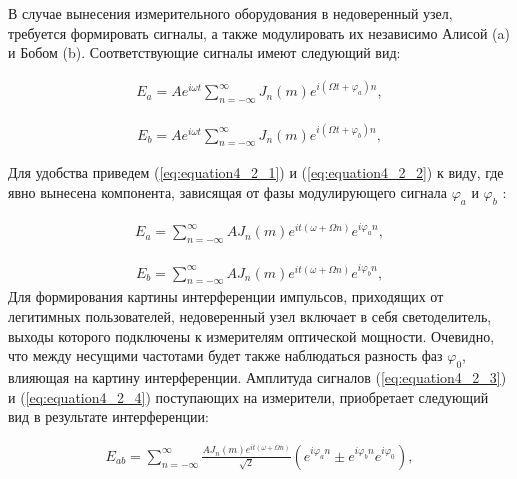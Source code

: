 В случае вынесения измерительного оборудования в недоверенный узел, требуется формировать сигналы, а также модулировать их независимо Алисой (a) и Бобом (b). Соответствующие сигналы имеют следующий вид:

\begin{equation}
	\begin{aligned}
	\label{eq:equation4_2_1}
		E_a = Ae^{i \omega t} \sum_{n=-\infty}^\infty J_{n}(m) e^{i (\Omega t+ \varphi_a) n},
	\end{aligned}
\end{equation}

\begin{equation}
	\begin{aligned}
	\label{eq:equation4_2_2}
		E_b = Ae^{i \omega t} \sum_{n=-\infty}^\infty J_{n}(m) e^{i (\Omega t+ \varphi_b) n},
	\end{aligned}
\end{equation}

Для удобства приведем (\ref{eq:equation4_2_1}) и (\ref{eq:equation4_2_2}) к виду, где явно вынесена компонента, зависящая от фазы модулирующего сигнала $\varphi_a$ и $\varphi_b$ :

\begin{equation}
	\begin{aligned}
	\label{eq:equation4_2_3}
		E_a = \sum_{n=-\infty}^\infty A J_{n}(m) e^{i t (\omega + \Omega n)} e^{i \varphi_a n},
	\end{aligned}
\end{equation}

\begin{equation}
	\begin{aligned}
	\label{eq:equation4_2_4}
		E_b = \sum_{n=-\infty}^\infty A J_{n}(m) e^{i t (\omega + \Omega n)} e^{i \varphi_b n},
	\end{aligned}
\end{equation}
Для формирования картины интерференции импульсов, приходящих от легитимных пользователей, недоверенный узел включает в себя светоделитель, выходы которого подключены к измерителям оптической мощности. Очевидно, что между несущими частотами будет также наблюдаться разность фаз $\varphi_0$, влияющая на картину интерференции. Амплитуда сигналов (\ref{eq:equation4_2_3}) и (\ref{eq:equation4_2_4}) поступающих на измерители, приобретает следующий вид в результате интерференции:

\begin{equation}
	\begin{aligned}
	\label{eq:equation4_2_5}
		E_{ab} = \sum_{n=-\infty}^\infty \frac{A J_{n}(m) e^{i t (\omega + \Omega n)}}{\sqrt{2}} (e^{i \varphi_a n} \pm e^{i \varphi_b n}e^{i \varphi_0}),
	\end{aligned}
\end{equation}



